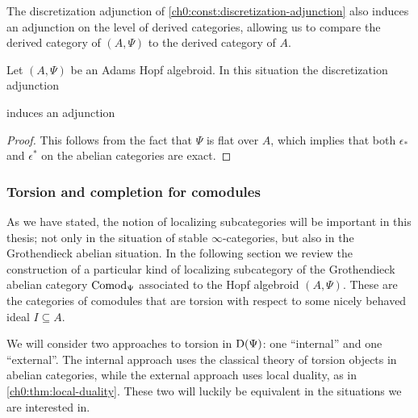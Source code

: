 The discretization adjunction of \cref{ch0:const:discretization-adjunction} also induces an adjunction on the level of derived categories, allowing us to compare the derived category of $(A, \Psi)$ to the derived category of $A$. 

\begin{proposition}
    Let $(A,\Psi)$ be an Adams Hopf algebroid. In this situation the discretization adjunction 
    \begin{center}
    \end{center}
    induces an adjunction
    \begin{center}
    \end{center}
\end{proposition}
\begin{proof}
    This follows from the fact that $\Psi$ is flat over $A$, which implies that both $\epsilon_*$ and $\epsilon^*$ on the abelian categories are exact. 
\end{proof}




\subsubsection{Torsion and completion for comodules}
\label{ch0:sssec:torsion-and-completion-for-comodules}

As we have stated, the notion of localizing subcategories will be important in this thesis; not only in the situation of stable $\infty$-categories, but also in the Grothendieck abelian situation. In the following section we review the construction of a particular kind of localizing subcategory of the Grothendieck abelian category $\mathrm{Comod}_\Psi$ associated to the Hopf algebroid $(A,\Psi)$. These are the categories of comodules that are torsion with respect to some nicely behaved ideal $I\subseteq A$. 

We will consider two approaches to torsion in $\mathrm{D}(\Psi)$: one ``internal'' and one ``external''. The internal approach uses the classical theory of torsion objects in abelian categories, while the external approach uses local duality, as in \cref{ch0:thm:local-duality}. These two will luckily be equivalent in the situations we are interested in. 

